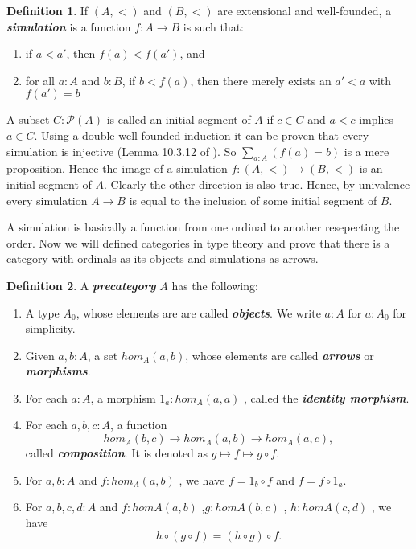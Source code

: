 \documentclass[11pt]{article}
\theoremstyle{definition}
\newtheorem{definition}{Definition}[section]
\theoremstyle{plain}
\theoremstyle{remark}
\newcommand{\Po}{\mathscr{P}}
\begin{document}
\begin{definition}\label{D:sim}
If $(A,<)$ and $(B,<)$ are extensional and well-founded, a \textbf{\textit{simulation}} is
a function $f : A \to B$ is such that:
\begin{enumerate}
\item if $a < a'$, then $f(a) < f(a')$, and
\item for all $a : A$ and $b : B$, if $b < f(a)$, then there merely exists an $a' < a$ with
      $f(a') = b$
\end{enumerate}
\end{definition} 

A subset $C : \Po (A)$ is called an initial segment of $A$ if $c \in C$ and $a < c$ implies
$a \in C$. Using a double well-founded induction it can be proven that every simulation is
injective (Lemma 10.3.12 of \cite{Hott}). So $\sum_{a : A} (f(a) = b)$ is a mere proposition.
Hence the image of a simulation $f : (A,<) \to (B,<)$ is an initial segment of $A$. Clearly
the other direction is also true. Hence, by univalence every simulation $A \to B$ is equal
to the inclusion of some initial segment of $B$.

A simulation is basically a function from one ordinal to another resepecting the order. Now
we will defined categories in type theory and prove that there is a category with ordinals
as its objects and simulations as arrows.

\begin{definition}\label{D:PreCat}
A \textbf{\textit{precategory}} $A$ has the following:

\begin{enumerate}
\item A type $A_0$, whose elements are are called \textbf{\textit{objects}}. We write $a : A$
    for $a : A_0$ for simplicity.

\item Given $a, b : A$, a set $hom_A(a,b)$, whose elements are called 
    \textbf{\textit{arrows}} or \textbf{\textit{morphisms}}.

\item For each $a : A$, a morphism $1_a : hom_A (a,a)$ , called the 
    \textbf{\textit{identity morphism}}.
    
\item For each $a, b, c : A$, a function 
    \[hom_A (b,c) \to hom_A (a,b) \to hom_A (a,c),\]
    called \textbf{\textit{composition}}. It is denoted as $g \mapsto f \mapsto g \circ f$.

\item For $a, b : A$ and $f : hom_A (a,b )$ , we have $f = 1_b \circ f$ and 
    $f = f \circ 1_a$.
    
\item For $a, b, c, d : A$ and $f : hom A ( a, b )$ ,$g : hom A ( b, c )$ , 
    $h : hom A ( c, d )$ , we have 
    \[ h \circ (g \circ f) = (h \circ g) \circ f .\]
    

\end{enumerate}

\end{definition} 
\end{document}
